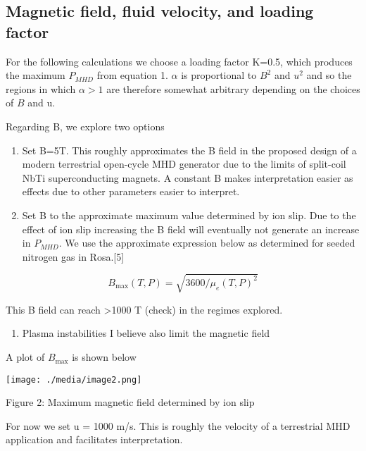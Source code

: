 \hypertarget{magnetic-field-fluid-velocity-and-loading-factor}{%
\subsection{Magnetic field, fluid velocity, and loading factor}\label{magnetic-field-fluid-velocity-and-loading-factor}}

For the following calculations we choose a loading factor K=0.5, which produces the maximum \(P_{MHD}\) from equation 1. \(\alpha\) is proportional to \(B^{2}\) and \(u^{2}\) and so the regions in which \(\alpha > 1\) are therefore somewhat arbitrary depending on the choices of \(B\) and u.

Regarding B, we explore two options

\begin{enumerate}
\def\labelenumi{\arabic{enumi})}
\item
  Set B=5T. This roughly approximates the B field in the proposed design of a modern terrestrial open-cycle MHD generator due to the limits of split-coil NbTi superconducting magnets. A constant B makes interpretation easier as effects due to other parameters easier to interpret.
\item
  Set B to the approximate maximum value determined by ion slip. Due to the effect of ion slip increasing the B field will eventually not generate an increase in \(P_{MHD}\). We use the approximate expression below as determined for seeded nitrogen gas in Rosa.{[}5{]}
\end{enumerate}

\begin{equation}
B_{\max}(T,P) = \sqrt{3600/\mu_{e}(T,P)^{2}}
\end{equation}


This B field can reach \textgreater1000 T (check) in the regimes explored.

\begin{enumerate}
\def\labelenumi{\alph{enumi}.}
\item
  Plasma instabilities I believe also limit the magnetic field
\end{enumerate}

A plot of \(B_{\max}\) is shown below

\texttt{[image: ./media/image2.png]}

Figure 2: Maximum magnetic field determined by ion slip

For now we set u = 1000 m/s. This is roughly the velocity of a terrestrial MHD application and facilitates interpretation.

